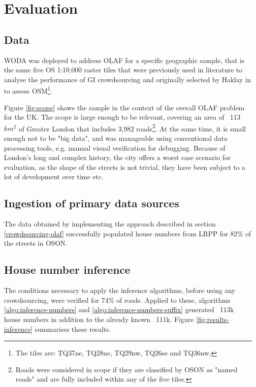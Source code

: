 \section{Evaluation}

\subsection{Data}

WODA was deployed to address OLAF for a specific geographic sample, that is the same five OS 1:10,000 raster tiles that were previously used in literature to analyse the performance of GI crowdsourcing and originally selected by Haklay in \cite{Haklay:2010vs} to assess OSM\footnote{The tiles are: TQ37ne, TQ28ne, TQ29nw, TQ26se and TQ36nw.}.

Figure \ref{fig:scope} shows the sample in the context of the overall OLAF problem for the UK. The scope is large enough to be relevant, covering an area of ~113 $ km^2 $ of Greater London that includes 3,982 roads\footnote{Roads were considered in scope if they are classified by OSON as "named roads" and are fully included within any of the five tiles.}. At the same time, it is small enough not to be "big data", and was manageable using conventional data processing tools, e.g. manual visual verification for debugging. Because of London's long and complex history, the city offers a worst case scenario for evaluation, as the shape of the streets is not trivial, they have been subject to a lot of development over time etc. 

\subsection{Ingestion of primary data sources}

The data obtained by implementing the approach described in section \ref{crowdsourcing-olaf} successfully populated house numbers from LRPP for 82\% of the streets in OSON.

\subsection{House number inference}

The conditions necessary to apply the inference algorithms, before using any crowdsourcing, were verified for 74\% of roads. Applied to these, algorithms \ref{algo:inference-numbers} and \ref{algo:inference-numbers-suffix} generated ~113k house numbers in addition to the already known ~111k. Figure \ref{fig:results-inference} summarises these results.

